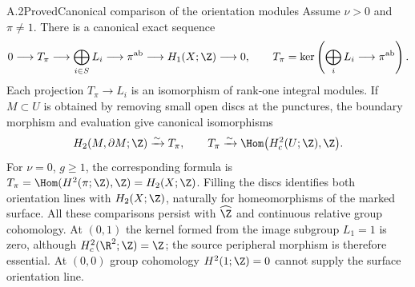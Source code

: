 \begin{claim}{A.2}{Proved}{Canonical comparison of the orientation modules}
Assume $\nu>0$ and $\pi\ne1$. There is a canonical exact sequence
\[
0\longrightarrow T_\pi\longrightarrow\bigoplus_{i\in S}L_i
 \longrightarrow\pi^{\mathrm{ab}}\longrightarrow H_1(X;\Z)\longrightarrow0,
\qquad
T_\pi=\ker\left(\bigoplus_iL_i\longrightarrow\pi^{\mathrm{ab}}\right).
\]
Each projection $T_\pi\to L_i$ is an isomorphism of rank-one integral modules. If $M\subset U$ is obtained by removing small open discs at the punctures, the boundary morphism and evaluation give canonical isomorphisms
\[
 H_2(M,\partial M;\Z)\xrightarrow{\sim}T_\pi,
 \qquad
 T_\pi\xrightarrow{\sim}\Hom\bigl(H^2_c(U;\Z),\Z\bigr).
\]
For $\nu=0$, $g\ge1$, the corresponding formula is
$T_\pi=\Hom(H^2(\pi;\Z),\Z)=H_2(X;\Z)$.
Filling the discs identifies both orientation lines with $H_2(X;\Z)$, naturally for homeomorphisms of the marked surface. All these comparisons persist with $\widehat\Z$ and continuous relative group cohomology. At $(0,1)$ the kernel formed from the image subgroup $L_1=1$ is zero, although $H^2_c(\R^2;\Z)=\Z$; the source peripheral morphism is therefore essential. At $(0,0)$ group cohomology $H^2(1;\Z)=0$ cannot supply the surface orientation line.
\end{claim}
